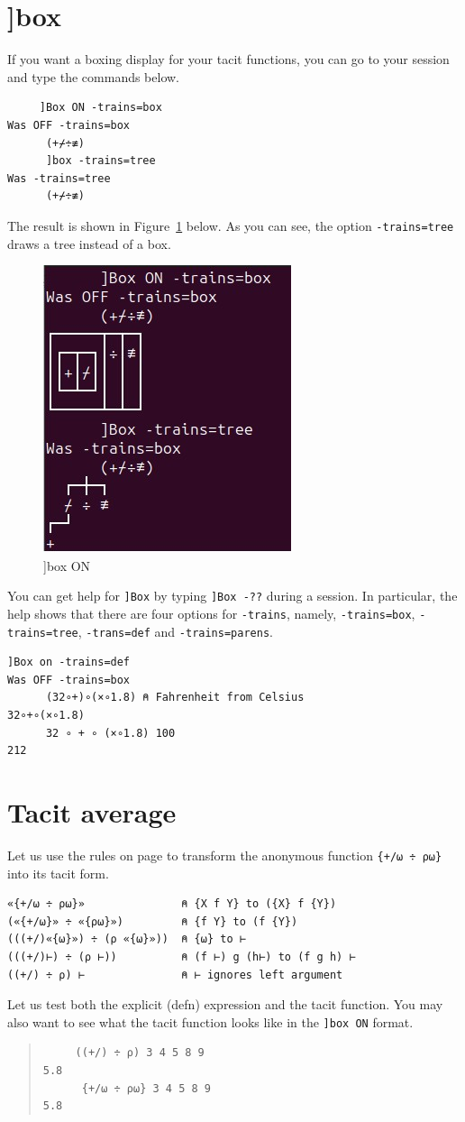 \documentclass[a4paper,12pt]{book}
\begin{document}
\section{]box}
  If you want a boxing display for your
  tacit functions, you can go to your session
  and type the commands below.
\begin{verbatim}
     ]Box ON -trains=box
Was OFF -trains=box
      (+⌿÷≢)
      ]box -trains=tree
Was -trains=tree
      (+⌿÷≢)
\end{verbatim}
The result is shown
in Figure~\ref{fig:boxon} below.
As you can see, the option \verb|-trains=tree| draws
a tree instead of a box.
\begin{figure}[!h]
\includegraphics{srcfigs/boxon.jpg}
\caption{]box ON}
\label{fig:boxon}
\end{figure}

You can get help for \verb|]Box| by
typing \verb|]Box -??| during a session.
In particular, the help shows that there
are four options for \verb|-trains|, namely,
\verb|-trains=box|, \verb|-trains=tree|,
\verb|-trans=def| and \verb|-trains=parens|.
\begin{lstlisting}[language=apl]
      ]Box on -trains=def
Was OFF -trains=box
      (32∘+)∘(×∘1.8) ⍝ Fahrenheit from Celsius
32∘+∘(×∘1.8)
      32 ∘ + ∘ (×∘1.8) 100
212
\end{lstlisting}

\section{Tacit average}
Let us use the rules on page \pageref{dfn-to-tacit}
to transform the anonymous
function \verb|{+/⍵ ÷ ⍴⍵}|
into its tacit form.
\begin{verbatim}
«{+/⍵ ÷ ⍴⍵}»               ⍝ {X f Y} to ({X} f {Y})
(«{+/⍵}» ÷ «{⍴⍵}»)         ⍝ {f Y} to (f {Y})
(((+/)«{⍵}») ÷ (⍴ «{⍵}»))  ⍝ {⍵} to ⊢
(((+/)⊢) ÷ (⍴ ⊢))          ⍝ (f ⊢) g (h⊢) to (f g h) ⊢
((+/) ÷ ⍴) ⊢               ⍝ ⊢ ignores left argument
\end{verbatim}
Let us test both the explicit (defn)
expression and the tacit function.
You may also want to see what the tacit
function looks like in the \verb|]box ON| format.
\begin{quote}
\begin{verbatim}
     ((+/) ÷ ⍴) 3 4 5 8 9
5.8
      {+/⍵ ÷ ⍴⍵} 3 4 5 8 9
5.8
\end{verbatim}
\end{quote}
\end{document}
